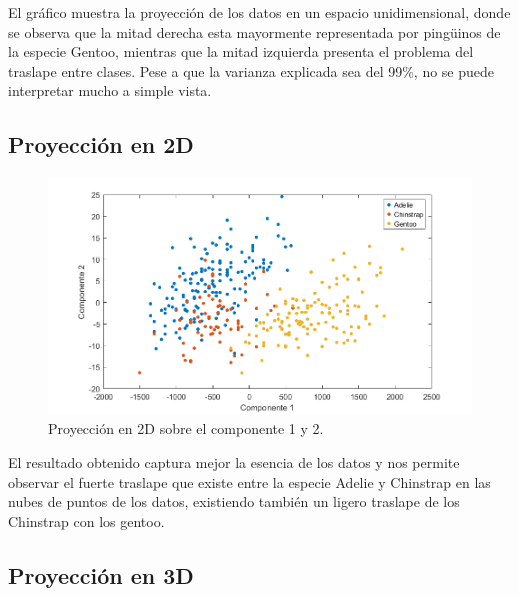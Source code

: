 \documentclass[11pt, letterpaper]{article}
\begin{document}
El gráfico muestra la proyección de los datos en un espacio unidimensional, donde se observa que la mitad derecha esta mayormente representada por pingüinos de la especie Gentoo, mientras que la mitad izquierda presenta el problema del traslape entre clases. Pese a que la varianza explicada sea del 99\%, no se puede interpretar mucho a simple vista.

\newpage

\subsection{Proyección en 2D}

\begin{figure}[h!]
	\centering
	\begin{minipage}{1.1\textwidth}
		\centering
		\includegraphics[width=\textwidth]{IMG/G4.png}
		\caption{Proyección en 2D sobre el componente 1 y 2.}
		\label{fig:f6}
	\end{minipage}\hfill
\end{figure}

El resultado obtenido captura mejor la esencia de los datos y nos permite observar el fuerte traslape que existe entre la especie Adelie y Chinstrap en las nubes de puntos de los datos, existiendo también un ligero traslape de los Chinstrap con los gentoo.

\newpage

\subsection{Proyección en 3D}
\end{document}
